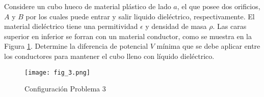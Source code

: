 \noindent Considere un cubo hueco de material plástico de lado $a$, el que posee dos orificios, $A$ y $B$ por los cuales puede entrar y salir liquido dieléctrico, respectivamente. El material dieléctrico tiene una permitividad $\epsilon$ y densidad de masa $\rho$. Las caras superior en inferior se forran con un material conductor, como se muestra en la Figura \ref{fig:fig_3}. Determine la diferencia de potencial $V$ mínima que se debe aplicar entre los conductores para mantener el cubo lleno con líquido dieléctrico.


\begin{figure}[H]
    \centering
    \texttt{[image: fig\_3.png]}
    \caption{Configuración Problema 3}
    \label{fig:fig_3}
\end{figure}
